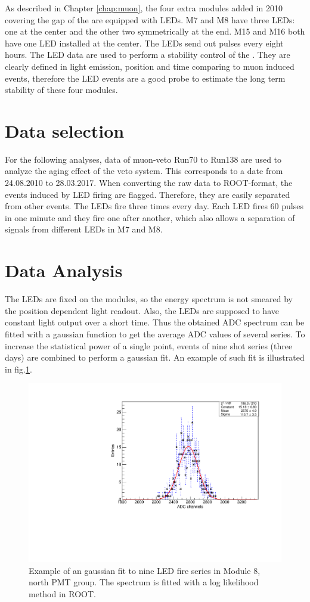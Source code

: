As described in Chapter \ref{chap:muon}, the four extra modules added in 2010 covering the gap of the \mvs{} are equipped with LEDs. M7 and M8 have three LEDs: one at the center and the other two symmetrically at the end. M15 and M16 both have one LED installed at the center. The LEDs send out pulses every eight hours. The LED data are used to perform a stability control of the \mvs{}. They are clearly defined in light emission, position and time comparing to muon induced events, therefore the LED events are a good probe to estimate the long term stability of these four modules.
\section{Data selection}
For the following analyses, data of muon-veto Run70 to Run138 are used to analyze the aging effect of the veto system. This corresponds to a date from 24.08.2010 to 28.03.2017. When converting the raw data to ROOT-format, the events induced by LED firing are flagged. Therefore, they are easily separated from other events.
The LEDs fire three times every day. Each LED fires 60 pulses in one minute and they fire one after another, which also allows a separation of signals from different LEDs in M7 and M8.



\section{Data Analysis}
\label{sec:led-ana}
The LEDs are fixed on the modules, so the energy spectrum is not smeared by the position dependent light readout. Also, the LEDs are supposed to have constant light output over a short time. Thus the obtained ADC spectrum can be fitted with a gaussian function to get the average ADC values of several series.
To increase the statistical power of a single point, events of nine shot series (three days) are combined to perform a gaussian fit. An example of such fit is illustrated in fig.\ref{fig:gaussian-fit}.

\begin{figure}[htb!]
  \centering
  \includegraphics[width=0.5\textwidth{}]{./fig/gaussianM8.pdf}
  \caption{Example of an gaussian fit to nine LED fire series in Module 8, north PMT group. The spectrum is fitted with a log likelihood method in ROOT.}
  \label{fig:gaussian-fit}
\end{figure}

